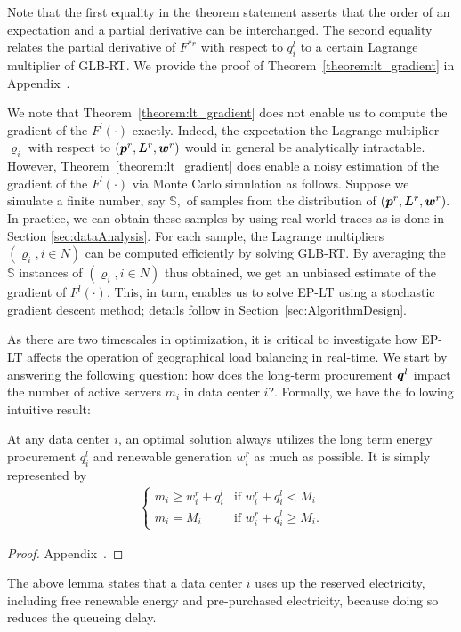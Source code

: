 Note that the first equality in the theorem statement asserts that the
order of an expectation and a partial derivative can be
interchanged. The second equality relates the partial derivative of
$F^{*r}$ with respect to $q^l_i$ to a certain Lagrange multiplier of
GLB-RT. We provide the proof of Theorem~\ref{theorem:lt_gradient} in
Appendix~.

We note that Theorem~\ref{theorem:lt_gradient} does not enable us to
compute the gradient of the $F^l(\cdot)$ exactly. Indeed, the
expectation the Lagrange multiplier $\varrho_i$ with respect to
$(\boldsymbol{p}^r,\boldsymbol{L}^r,\boldsymbol{w}^r)$ would in general be
analytically intractable. However, Theorem~\ref{theorem:lt_gradient}
does enable a noisy estimation of the gradient of the $F^l(\cdot)$ via
Monte Carlo simulation as follows. Suppose we simulate a finite
number, say $\mathbb{S},$ of samples from the distribution of
$(\boldsymbol{p}^r,\boldsymbol{L}^r,\boldsymbol{w}^r).$ In practice, we can obtain
these samples by using real-world traces as is done in Section
\ref{sec:dataAnalysis}. For each sample, the Lagrange multipliers
$(\varrho_i, i \in N)$ can be computed efficiently by solving
GLB-RT. By averaging the $\mathbb{S}$ instances of $(\varrho_i, i \in
N)$ thus obtained, we get an unbiased estimate of the gradient of
$F^l(\cdot).$ This, in turn, enables us to solve EP-LT using a
stochastic gradient descent method; details follow in
Section~\ref{sec:AlgorithmDesign}.



As there are two timescales in optimization, it is critical to investigate how EP-LT affects the operation of geographical load balancing in real-time. We start by answering the following question: how does the long-term procurement $\boldsymbol{q}^l$ impact the number of active servers $m_i$ in data center $i$?. Formally, we have the following intuitive result:
\begin{lemma}    
	\label{theorem:RealTimeOptimalDemand}
	At any data center $i$, an optimal solution always utilizes the long term energy procurement $q^l_i$ and renewable generation $w^r_i$ as much as possible. It is simply represented by
	\begin{eqnarray}         
	\begin{cases} 
	m_i \geq w^r_i+q^l_i  &\mbox{if  } w^r_i + q^l_i < M_i \\ 
	m_i = M_i & \mbox{if  } w^r_i + q^l_i \geq M_i. 
	\end{cases}
	\end{eqnarray}
\end{lemma}
\begin{proof} Appendix~.
\end{proof}
The above lemma states that a data center $i$ uses up the reserved
electricity, including free renewable energy and pre-purchased
electricity, because doing so reduces the queueing delay.


